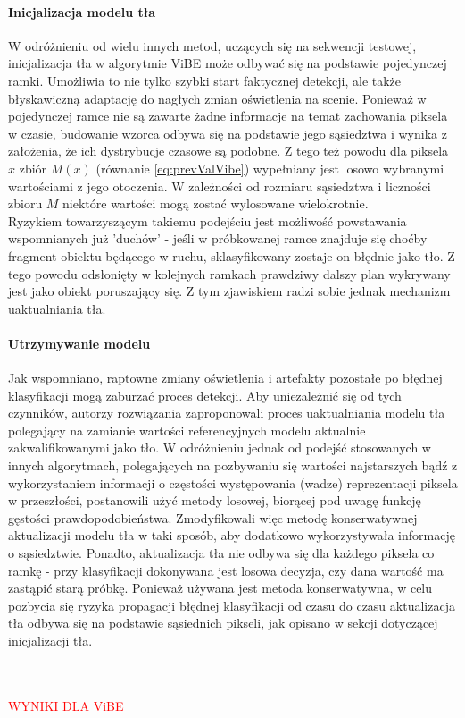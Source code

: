\paragraph{Inicjalizacja modelu tła \\}
W odróżnieniu od wielu innych metod, uczących się na sekwencji testowej, inicjalizacja tła w algorytmie ViBE może odbywać się na podstawie pojedynczej ramki. Umożliwia to nie tylko szybki start faktycznej detekcji, ale także błyskawiczną adaptację do nagłych zmian oświetlenia na scenie. Ponieważ w pojedynczej ramce nie są zawarte żadne informacje na temat zachowania piksela w czasie, budowanie wzorca odbywa się na podstawie jego sąsiedztwa i wynika z założenia, że ich dystrybucje czasowe są podobne. Z tego też powodu dla piksela $x$ zbiór $M(x)$ (równanie \ref{eq:prevValVibe}) wypełniany jest losowo wybranymi wartościami z jego otoczenia. W zależności od rozmiaru sąsiedztwa i liczności zbioru $M$ niektóre wartości mogą zostać wylosowane wielokrotnie.\\
Ryzykiem towarzyszącym takiemu podejściu jest możliwość powstawania wspomnianych już 'duchów' - jeśli w próbkowanej ramce znajduje się choćby fragment obiektu będącego w ruchu, sklasyfikowany zostaje on błędnie jako tło. Z tego powodu odsłonięty w kolejnych ramkach prawdziwy dalszy plan wykrywany jest jako obiekt poruszający się. Z tym zjawiskiem radzi sobie jednak mechanizm uaktualniania tła.
\paragraph{Utrzymywanie modelu \\}
Jak wspomniano, raptowne zmiany oświetlenia i artefakty pozostałe po błędnej klasyfikacji mogą zaburzać proces detekcji. Aby uniezależnić się od tych czynników, autorzy rozwiązania zaproponowali proces uaktualniania modelu tła polegający na zamianie wartości referencyjnych modelu aktualnie zakwalifikowanymi jako tło. W odróżnieniu jednak od podejść stosowanych w innych algorytmach, polegających na pozbywaniu się wartości najstarszych bądź z wykorzystaniem informacji o częstości występowania (wadze) reprezentacji piksela w przeszłości, postanowili użyć metody losowej, biorącej pod uwagę funkcję gęstości prawdopodobieństwa. Zmodyfikowali więc metodę konserwatywnej aktualizacji modelu tła w taki sposób, aby dodatkowo wykorzystywała informację o sąsiedztwie. Ponadto, aktualizacja tła nie odbywa się dla każdego piksela co ramkę - przy klasyfikacji dokonywana jest losowa decyzja, czy dana wartość ma zastąpić starą próbkę. Ponieważ używana jest metoda konserwatywna, w celu pozbycia się ryzyka propagacji błędnej klasyfikacji od czasu do czasu aktualizacja tła odbywa się na podstawie sąsiednich pikseli, jak opisano w sekcji dotyczącej inicjalizacji tła.\\ \\ \\
\begin{LARGE}
\textcolor{red}{WYNIKI DLA ViBE}
\end{LARGE}
